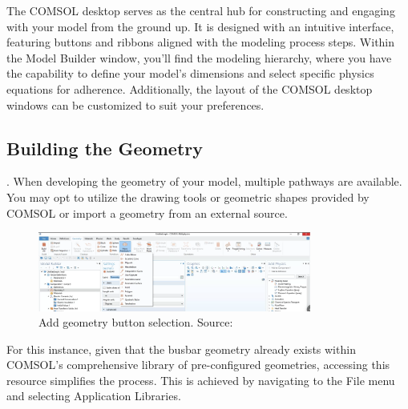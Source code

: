 The COMSOL desktop serves as the central hub for constructing and engaging with your model from the ground up. It is designed with an intuitive interface, featuring buttons and ribbons aligned with the modeling process steps. Within the Model Builder window, you'll find the modeling hierarchy, where you have the capability to define your model's dimensions and select specific physics equations for adherence. Additionally, the layout of the COMSOL desktop windows can be customized to suit your preferences.

\subsection{Building the Geometry}.
When developing the geometry of your model, multiple pathways are available. You may opt to utilize the drawing tools or geometric shapes provided by COMSOL or import a geometry from an external source.

\begin{figure}[H]
  \centering
  \includegraphics[width=0.8\textwidth]{Chapters/Figures/Chapter 3 Figures/Geometry Tab.png}
  \caption{Add geometry button selection. Source: \cite{multiphysics__modeling_nodate}}
  \label{fig:Add geometry button selection.}
\end{figure}

For this instance, given that the busbar geometry already exists within COMSOL's comprehensive library of pre-configured geometries, accessing this resource simplifies the process. This is achieved by navigating to the File menu and selecting Application Libraries.

